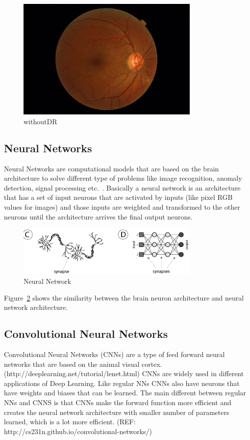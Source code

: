 \begin{figure}[t]
\caption{withoutDR}
\label{fignoDR}
\centering
\includegraphics[width=0.8\textwidth]{Figures/NODR}
\end{figure}

\subsection{Neural Networks}
Neural Networks are computational models that are based on the brain architecture to solve different type of problems like image recognition, anomaly detection, signal processing etc.\ \citep{shiffman2012nature}. Basically a neural network is an architecture that has a set of input neurons that are activated by inputs (like pixel RGB values for images) and those inputs are weighted and transformed to the other neurons until the architecture arrives the final output neurons. 

\begin{figure}[t]
\caption{Neural Network}
\label{fignn}
\centering
\includegraphics[width=0.8\textwidth]{Figures/nn}
\end{figure}

Figure~\ref{fignn} shows the similarity between the brain neuron architecture and neural network architecture. 

\subsection{Convolutional Neural Networks}
Convolutional Neural Networks (CNNs) are a type of feed forward neural networks that are based on the animal visual cortex. (http://deeplearning.net/tutorial/lenet.html) CNNs are widely used in different applications of Deep Learning. 
Like regular NNs CNNs also have neurons that have weights and biases that can be learned. The main different between regular NNs and CNNS is that CNNs make the forward function more efficient and creates the neural network architecture with smaller number of parameters learned, which is a lot more efficient. (REF: http://cs231n.github.io/convolutional-networks/) 

